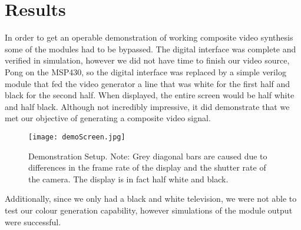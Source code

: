 \section{Results}

In order to get an operable demonstration of working composite video synthesis
some of the modules had to be bypassed. The digital interface was complete and
verified in simulation, however we did not have time to finish our video source,
Pong on the MSP430, so the digital interface was replaced by a simple verilog
module that fed the video generator a line that was white for the first half and
black for the second half. When displayed, the entire screen would be half white
and half black. Although not incredibly impressive, it did demonstrate that we
met our objective of generating a composite video signal.

\begin{figure} [H]
    \centering
    \texttt{[image: demoScreen.jpg]}
    \caption{Demonstration Setup. Note: Grey diagonal bars are caused due to
    differences in the frame rate of the display and the shutter rate of the
    camera. The display is in fact half white and black.}
\end{figure}

Additionally, since we only had a black and white television, we were not able
to test our colour generation capability, however simulations of the module
output were successful.

